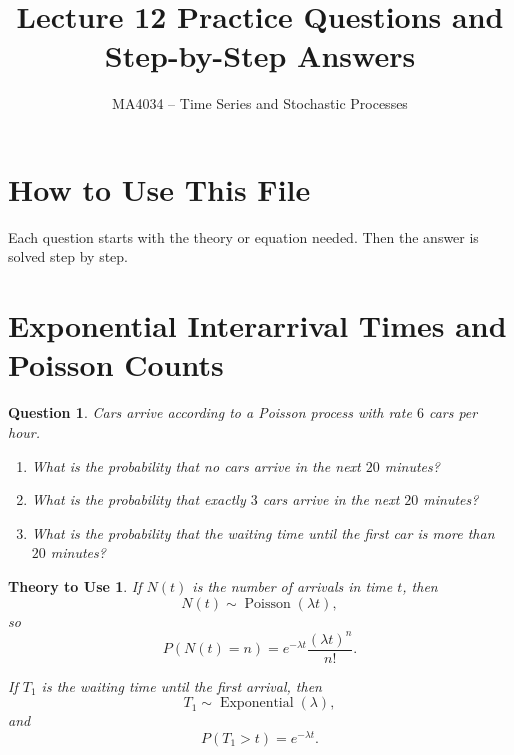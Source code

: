 \documentclass[12pt]{article}
\title{Lecture 12 Practice Questions and Step-by-Step Answers}
\author{MA4034 -- Time Series and Stochastic Processes}
\date{}
\newtheorem{question}{Question}
\newtheorem*{theory}{Theory to Use}
\begin{document}
\maketitle

\section*{How to Use This File}

Each question starts with the theory or equation needed. Then the answer is solved step by step.

\section{Exponential Interarrival Times and Poisson Counts}

\begin{question}
Cars arrive according to a Poisson process with rate \(6\) cars per hour.
\begin{enumerate}[label=(\alph*)]
    \item What is the probability that no cars arrive in the next \(20\) minutes?
    \item What is the probability that exactly \(3\) cars arrive in the next \(20\) minutes?
    \item What is the probability that the waiting time until the first car is more than \(20\) minutes?
\end{enumerate}
\end{question}

\begin{theory}
If \(N(t)\) is the number of arrivals in time \(t\), then
\[
N(t)\sim \operatorname{Poisson}(\lambda t),
\]
so
\[
P(N(t)=n)=e^{-\lambda t}\frac{(\lambda t)^n}{n!}.
\]

If \(T_1\) is the waiting time until the first arrival, then
\[
T_1\sim \operatorname{Exponential}(\lambda),
\]
and
\[
P(T_1>t)=e^{-\lambda t}.
\]
\end{theory}
\end{document}
